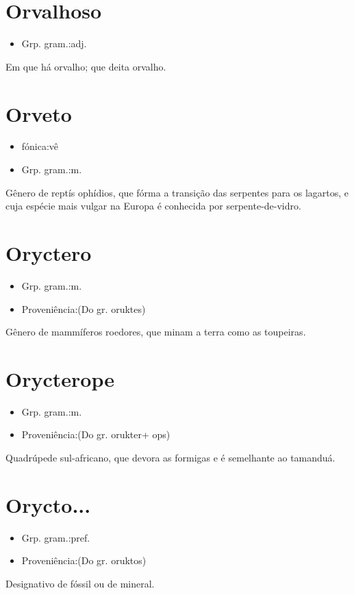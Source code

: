 \section{Orvalhoso}
\begin{itemize}
\item {Grp. gram.:adj.}
\end{itemize}
Em que há orvalho; que deita orvalho.
\section{Orveto}
\begin{itemize}
\item {fónica:vê}
\end{itemize}
\begin{itemize}
\item {Grp. gram.:m.}
\end{itemize}
Gênero de reptís ophídios, que fórma a transição das serpentes para os lagartos, e cuja espécie mais vulgar na Europa é conhecida por \textunderscore serpente-de-vidro\textunderscore .
\section{Oryctero}
\begin{itemize}
\item {Grp. gram.:m.}
\end{itemize}
\begin{itemize}
\item {Proveniência:(Do gr. \textunderscore oruktes\textunderscore )}
\end{itemize}
Gênero de mammíferos roedores, que minam a terra como as toupeiras.
\section{Orycterope}
\begin{itemize}
\item {Grp. gram.:m.}
\end{itemize}
\begin{itemize}
\item {Proveniência:(Do gr. \textunderscore orukter\textunderscore  + \textunderscore ops\textunderscore )}
\end{itemize}
Quadrúpede sul-africano, que devora as formigas e é semelhante ao tamanduá.
\section{Orycto...}
\begin{itemize}
\item {Grp. gram.:pref.}
\end{itemize}
\begin{itemize}
\item {Proveniência:(Do gr. \textunderscore oruktos\textunderscore )}
\end{itemize}
Designativo de fóssil ou de mineral.
